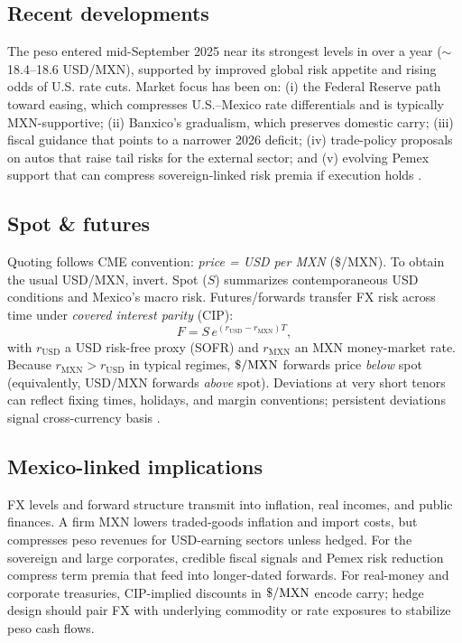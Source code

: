 \documentclass[11pt,a4paper]{article} %
\begin{document}
\subsection{Recent developments}
The peso entered mid-September 2025 near its strongest levels in over a year (\(\sim\)18.4–18.6 USD/MXN), supported by improved global risk appetite and rising odds of U.S. rate cuts. Market focus has been on: (i) the Federal Reserve path toward easing, which compresses U.S.–Mexico rate differentials and is typically MXN-supportive; (ii) Banxico’s gradualism, which preserves domestic carry; (iii) fiscal guidance that points to a narrower 2026 deficit; (iv) trade-policy proposals on autos that raise tail risks for the external sector; and (v) evolving Pemex support that can compress sovereign-linked risk premia if execution holds \citep{reuters_usdmxn_quote,reuters_mx_markets_11sep,reuters_mx_markets_12sep,reuters_fed_poll_2025,reuters_cenbank_graphic_2025,reuters_banxico_jun26_2025,banxico_calendar_2025,reuters_budget_2026_2025,reuters_tariffs_autos_2025,reuters_pemex_plan_2025,reuters_fitch_pemex_2025}.

\subsection{Spot \& futures}
Quoting follows CME convention: \emph{price = USD per MXN} (\$/MXN). To obtain the usual USD/MXN, invert. Spot (\(S\)) summarizes contemporaneous USD conditions and Mexico’s macro risk. Futures/forwards transfer FX risk across time under \emph{covered interest parity} (CIP):
\[
F = S\,e^{(r_{\mathrm{USD}}-r_{\mathrm{MXN}})T},
\]
with \(r_{\mathrm{USD}}\) a USD risk-free proxy (SOFR) and \(r_{\mathrm{MXN}}\) an MXN money-market rate. Because \(r_{\mathrm{MXN}}>r_{\mathrm{USD}}\) in typical regimes, \(\$/{\rm MXN}\) forwards price \emph{below} spot (equivalently, USD/MXN forwards \emph{above} spot). Deviations at very short tenors can reflect fixing times, holidays, and margin conventions; persistent deviations signal cross-currency basis \citep{bis_cip_2016,bis_cip_2024,frbny_sofr,frbny_sofr_index,cme_fx_overview,cme_mxn_product,cme_mxn_rulebook}.

\subsection{Mexico-linked implications}
FX levels and forward structure transmit into inflation, real incomes, and public finances. A firm MXN lowers traded-goods inflation and import costs, but compresses peso revenues for USD-earning sectors unless hedged. For the sovereign and large corporates, credible fiscal signals and Pemex risk reduction compress term premia that feed into longer-dated forwards. For real-money and corporate treasuries, CIP-implied discounts in \(\$/{\rm MXN}\) encode carry; hedge design should pair FX with underlying commodity or rate exposures to stabilize peso cash flows.
\end{document}
